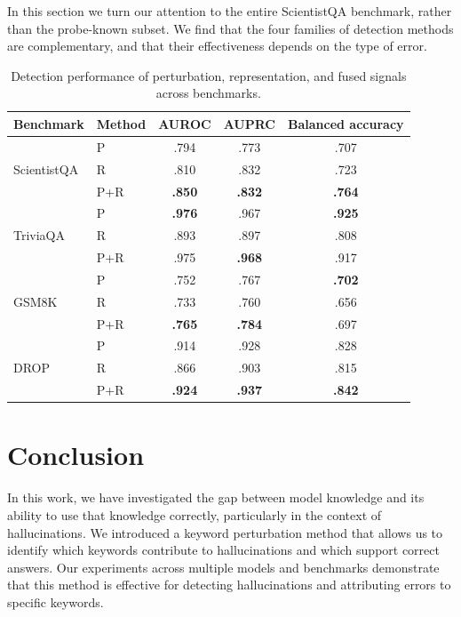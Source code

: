 In this section we turn our attention to the entire ScientistQA benchmark, rather than the probe-known subset. We find that the four families of detection methods are complementary, and that their effectiveness depends on the type of error. 

\begin{table}[t]
\centering
\caption{Detection performance of perturbation, representation, and fused signals across benchmarks.}
\label{tab:cross-benchmark-signal-fusion}
\label{tab:scientistqa-signal-fusion}
\small
\setlength{\tabcolsep}{9pt}
\begin{tabular}{llccc}
\toprule
Benchmark & Method & AUROC & AUPRC & Balanced accuracy \\
\midrule
& P   & .794 & .773 & .707 \\
ScientistQA & R   & .810 & .832 & .723 \\
& P+R & \textbf{.850} & \textbf{.832} & \textbf{.764} \\
\midrule
& P   & \textbf{.976} & .967 & \textbf{.925} \\
TriviaQA & R   & .893 & .897 & .808 \\
& P+R & .975 & \textbf{.968} & .917 \\
\midrule
& P   & .752 & .767 & \textbf{.702} \\
GSM8K & R   & .733 & .760 & .656 \\
& P+R & \textbf{.765} & \textbf{.784} & .697 \\
\midrule
& P   & .914 & .928 & .828 \\
DROP & R   & .866 & .903 & .815 \\
& P+R & \textbf{.924} & \textbf{.937} & \textbf{.842} \\
\bottomrule
\end{tabular}
\end{table}

\section{Conclusion}
In this work, we have investigated the gap between model knowledge and its ability to use that knowledge correctly, particularly in the context of hallucinations. We introduced a keyword perturbation method that allows us to identify which keywords contribute to hallucinations and which support correct answers. Our experiments across multiple models and benchmarks demonstrate that this method is effective for detecting hallucinations and attributing errors to specific keywords.

